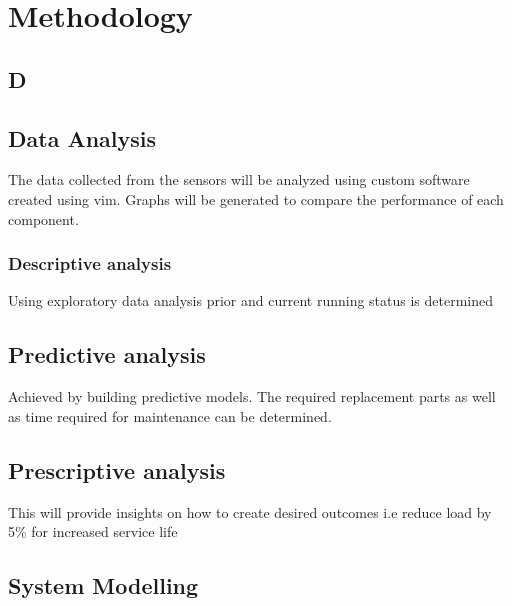 
\section{Methodology}

\subsection{D}




\subsection{ Data Analysis}
The data collected from the sensors will be analyzed using custom software created using vim. Graphs will be generated to compare the performance of each component.

	\subsubsection{Descriptive analysis}
	Using exploratory data analysis prior and current running status is determined 
	
	\subsection{Predictive analysis}
	Achieved by building predictive models. The required replacement parts as well as time required for maintenance can be determined.
	
	\subsection{Prescriptive analysis}
	This will provide insights on how to create desired outcomes i.e reduce load by 5\% for increased service life 
	
\subsection{System Modelling}

